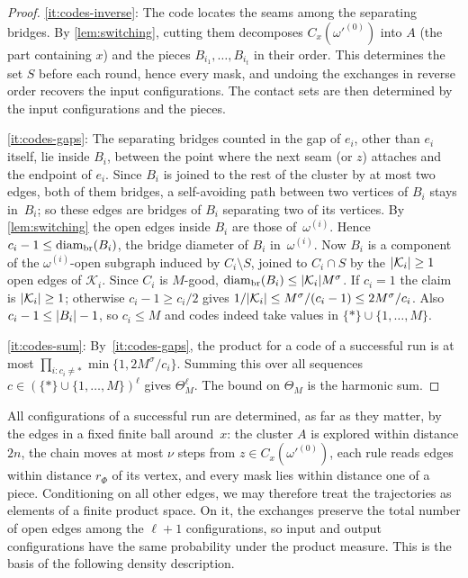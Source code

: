 \begin{proof}
\ref{it:codes-inverse}: The code locates the seams among the separating bridges. By
\cref{lem:switching}, cutting them decomposes $C_x(\omega'^{(0)})$ into $A$ (the part containing $x$)
and the pieces $B_{i_1},\dots,B_{i_t}$ in their order. This determines the set $S$ before each round,
hence every mask, and undoing the exchanges in reverse order recovers the input configurations. The
contact sets are then determined by the input configurations and the pieces.

\ref{it:codes-gaps}: The separating bridges counted in the gap of $e_i$, other than $e_i$ itself, lie
inside $B_i$, between the point where the next seam (or $z$) attaches and the endpoint of $e_i$.
Since $B_i$ is joined to the rest of the cluster by at most two edges, both of them bridges, a
self-avoiding path between two vertices of $B_i$ stays in~$B_i$; so these edges are bridges of $B_i$
separating two of its vertices.
By \cref{lem:switching} the open edges inside $B_i$ are those of~$\omega^{(i)}$. Hence
$c_i-1\le\operatorname{diam}_{\mathrm{br}}(B_i)$, the bridge diameter of $B_i$ in~$\omega^{(i)}$. Now $B_i$ is a component of the
$\omega^{(i)}$-open subgraph induced by $C_i\setminus S$, joined to $C_i\cap S$ by the
$\lvert\mathcal K_i\rvert\ge1$ open edges of $\mathcal K_i$. Since $C_i$ is $M$-good, $\operatorname{diam}_{\mathrm{br}}(B_i)\le
\lvert\mathcal K_i\rvert M^\sigma$. If $c_i=1$ the claim is $\lvert\mathcal K_i\rvert\ge1$; otherwise $c_i-1\ge
c_i/2$ gives $1/\lvert\mathcal K_i\rvert\le M^\sigma/(c_i-1)\le2M^\sigma/c_i$. Also $c_i-1\le\lvert B_i\rvert-1$,
so $c_i\le M$ and codes indeed take values in $\{\ast\}\cup\{1,\dots,M\}$.

\ref{it:codes-sum}: By~\ref{it:codes-gaps}, the product for a code of a successful run is at most
$\prod_{i\colon c_i\neq\ast}\min\{1,2M^\sigma/c_i\}$. Summing this over all sequences
$c\in(\{\ast\}\cup\{1,\dots,M\})^\ell$ gives $\Theta_M^\ell$. The bound on $\Theta_M$ is the harmonic sum.
\end{proof}

All configurations of a successful run are determined, as far as they matter, by the edges in a fixed
finite ball around~$x$: the cluster $A$ is explored within distance $2n$, the chain moves at most $\nu$
steps from $z\in C_x(\omega'^{(0)})$, each rule reads edges within distance $r_\Phi$ of its vertex, and
every mask lies within distance one of a piece. Conditioning on all other edges, we may therefore treat
the trajectories as elements of a finite product space. On it, the exchanges preserve the total number
of open edges among the $\ell+1$ configurations, so input and output configurations have the same
probability under the product measure. This is the basis of the following density description.

